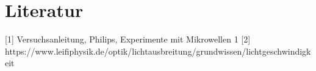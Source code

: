 \section{Literatur}
[1] Versuchsanleitung, Philips, Experimente mit Mikrowellen 1
[2] https://www.leifiphysik.de/optik/lichtausbreitung/grundwissen/lichtgeschwindigkeit























